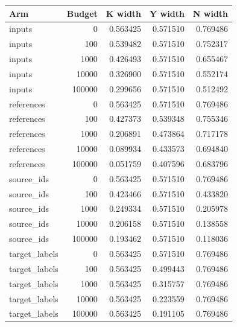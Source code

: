 \begingroup\small
\setlength{\tabcolsep}{4pt}
\begin{longtable}{lrrrr}
\toprule

Arm & Budget & K width & Y width & N width\\\midrule\endhead

inputs & 0 & 0.563425 & 0.571510 & 0.769486\\

inputs & 100 & 0.539482 & 0.571510 & 0.752317\\

inputs & 1000 & 0.426493 & 0.571510 & 0.655467\\

inputs & 10000 & 0.326900 & 0.571510 & 0.552174\\

inputs & 100000 & 0.299656 & 0.571510 & 0.512492\\

references & 0 & 0.563425 & 0.571510 & 0.769486\\

references & 100 & 0.427373 & 0.539348 & 0.755346\\

references & 1000 & 0.206891 & 0.473864 & 0.717178\\

references & 10000 & 0.089934 & 0.433573 & 0.694840\\

references & 100000 & 0.051759 & 0.407596 & 0.683796\\

source\_ids & 0 & 0.563425 & 0.571510 & 0.769486\\

source\_ids & 100 & 0.423466 & 0.571510 & 0.433820\\

source\_ids & 1000 & 0.249334 & 0.571510 & 0.205978\\

source\_ids & 10000 & 0.206158 & 0.571510 & 0.138558\\

source\_ids & 100000 & 0.193462 & 0.571510 & 0.118036\\

target\_labels & 0 & 0.563425 & 0.571510 & 0.769486\\

target\_labels & 100 & 0.563425 & 0.499443 & 0.769486\\

target\_labels & 1000 & 0.563425 & 0.315757 & 0.769486\\

target\_labels & 10000 & 0.563425 & 0.223559 & 0.769486\\

target\_labels & 100000 & 0.563425 & 0.191105 & 0.769486\\

\bottomrule
\end{longtable}
\endgroup

